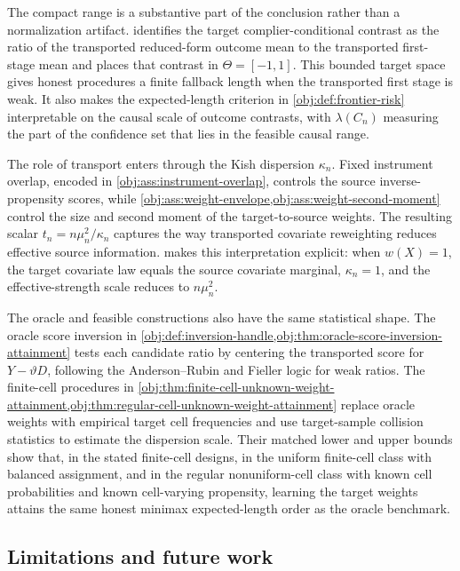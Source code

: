 \documentclass[11pt]{article}
\begin{document}
The compact range is a substantive part of the conclusion rather than a normalization artifact.  identifies the target complier-conditional contrast as the ratio of the transported reduced-form outcome mean to the transported first-stage mean and places that contrast in \(\Theta=[-1,1]\). This bounded target space gives honest procedures a finite fallback length when the transported first stage is weak. It also makes the expected-length criterion in \cref{obj:def:frontier-risk} interpretable on the causal scale of outcome contrasts, with \(\lambda(C_n)\) measuring the part of the confidence set that lies in the feasible causal range.

The role of transport enters through the Kish dispersion \(\kappa_n\). Fixed instrument overlap, encoded in \cref{obj:ass:instrument-overlap}, controls the source inverse-propensity scores, while \cref{obj:ass:weight-envelope,obj:ass:weight-second-moment} control the size and second moment of the target-to-source weights. The resulting scalar \(t_n=n\mu_n^2/\kappa_n\) captures the way transported covariate reweighting reduces effective source information.  makes this interpretation explicit: when \(w(X)=1\), the target covariate law equals the source covariate marginal, \(\kappa_n=1\), and the effective-strength scale reduces to \(n\mu_n^2\).

The oracle and feasible constructions also have the same statistical shape. The oracle score inversion in \cref{obj:def:inversion-handle,obj:thm:oracle-score-inversion-attainment} tests each candidate ratio by centering the transported score for \(Y-\vartheta D\), following the Anderson--Rubin and Fieller logic for weak ratios. The finite-cell procedures in \cref{obj:thm:finite-cell-unknown-weight-attainment,obj:thm:regular-cell-unknown-weight-attainment} replace oracle weights with empirical target cell frequencies and use target-sample collision statistics to estimate the dispersion scale. Their matched lower and upper bounds show that, in the stated finite-cell designs, in the uniform finite-cell class with balanced assignment, and in the regular nonuniform-cell class with known cell probabilities and known cell-varying propensity, learning the target weights attains the same honest minimax expected-length order as the oracle benchmark.

\subsection{Limitations and future work}
\end{document}
